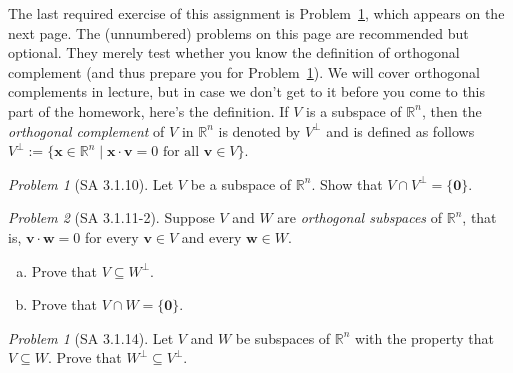 \documentclass[fleqn,11pt]{paper}
\theoremstyle{remark}
\newtheorem{problem}{Problem}
\newtheorem*{prob}{Problem}
\newtheorem*{solution}{{\bf Solution}}
\newcommand\R{\fld{R}}
\renewcommand{\vec}[1]{\mathbf{#1}}
\newcommand{\<}{\ensuremath{\langle}}
\renewcommand{\>}{\ensuremath{\rangle}}
\newcommand\fld[1]{\ensuremath{\mathbb{#1}}}
\newcommand\vv{\vec{v}}
\newcommand\vw{\vec{w}}
\newcommand\vx{\vec{x}}
\newcommand\vzero{\vec{0}}
\begin{document}
\newpage
\noindent The last required exercise of this assignment is Problem~\ref{prob:6},
which appears on the next page.
The (unnumbered) problems on this page are recommended but optional.
They merely test whether you know the definition of orthogonal complement 
(and thus prepare you for Problem~\ref{prob:6}).
We will cover orthogonal complements in lecture, but in case we don't get to it 
before you come to this part of the homework, here's the definition.
If $V$ is a subspace of $\R^n$, then the \emph{orthogonal complement} of $V$ in $\R^n$ 
is denoted by $V^\bot$ and is defined as follows
$V^\bot := \{ \vx \in \R^n \mid \vx \cdot \vv = 0 \text{ for all $\vv\in V$}\}$.
\probskip

\begin{prob}[SA 3.1.10]
Let $V$ be a subspace of $\R^n$. Show that $V \cap V^\bot = \{\vzero \}$.
\end{prob}
\probskip


\begin{prob}[SA 3.1.11-2]
Suppose $V$ and $W$ are \emph{orthogonal subspaces} of $\R^n$, that is, 
$\vv \cdot \vw = 0$ for every $\vv \in V$ and every $\vw \in W$. 
\begin{enumerate}[(a)]
\item Prove that $V \subseteq W^\bot$.
\item Prove that $V \cap W = \{\vzero\}$.
\end{enumerate}
\end{prob}
\newpage


\begin{problem}[SA 3.1.14]
\label{prob:6}
Let $V$ and $W$ be subspaces of $\R^n$ with the property that 
$V \subseteq W$. Prove that $W^{\bot} \subseteq V^\bot$.
\end{problem}
\end{document}
